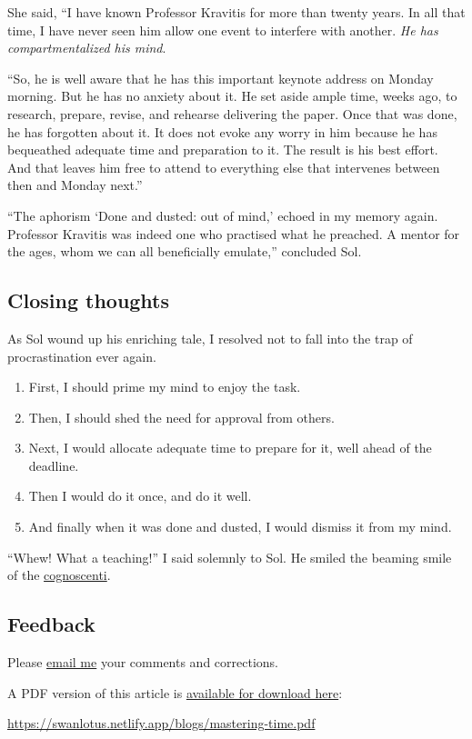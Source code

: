 \documentclass[
  a4paper,
]{article}
\providecommand{\tightlist}{%
  \setlength{\itemsep}{0pt}\setlength{\parskip}{0pt}}
\begin{document}
She said, ``I have known Professor Kravitis for more than twenty years.
In all that time, I have never seen him allow one event to interfere
with another. \emph{He has compartmentalized his mind}.

``So, he is well aware that he has this important keynote address on
Monday morning. But he has no anxiety about it. He set aside ample time,
weeks ago, to research, prepare, revise, and rehearse delivering the
paper. Once that was done, he has forgotten about it. It does not evoke
any worry in him because he has bequeathed adequate time and preparation
to it. The result is his best effort. And that leaves him free to attend
to everything else that intervenes between then and Monday next.''

``The aphorism `Done and dusted: out of mind,' echoed in my memory
again. Professor Kravitis was indeed one who practised what he preached.
A mentor for the ages, whom we can all beneficially emulate,'' concluded
Sol.

\hypertarget{closing-thoughts}{%
\subsection{Closing thoughts}\label{closing-thoughts}}

As Sol wound up his enriching tale, I resolved not to fall into the trap
of procrastination ever again.

\begin{enumerate}
\tightlist
\item
  First, I should prime my mind to enjoy the task.
\item
  Then, I should shed the need for approval from others.
\item
  Next, I would allocate adequate time to prepare for it, well ahead of
  the deadline.
\item
  Then I would do it once, and do it well.
\item
  And finally when it was done and dusted, I would dismiss it from my
  mind.
\end{enumerate}

``Whew! What a teaching!'' I said solemnly to Sol. He smiled the beaming
smile of the
\href{https://www.dictionary.com/browse/cognoscenti}{cognoscenti}.

\hypertarget{feedback}{%
\subsection{Feedback}\label{feedback}}

Please \href{mailto:feedback.swanlotus@gmail.com}{email me} your
comments and corrections.

\noindent A PDF version of this article is
\href{./mastering-time.pdf}{available for download here}:

\begin{small}

\begin{sffamily}

\url{https://swanlotus.netlify.app/blogs/mastering-time.pdf}

\end{sffamily}

\end{small}
\end{document}
